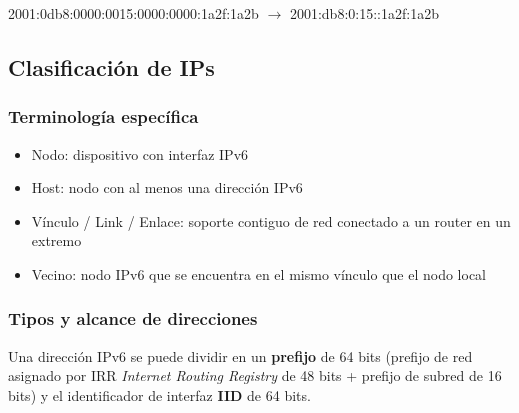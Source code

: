 \documentclass{book}
\begin{document}
	\begin{center}
		2001:0db8:0000:0015:0000:0000:1a2f:1a2b $\rightarrow$ 2001:db8:0:15::1a2f:1a2b
	\end{center}
	
	\subsection{Clasificación de IPs}
	
	\subsubsection{Terminología específica}
	\begin{itemize}
		\item Nodo: dispositivo con interfaz IPv6
		\item Host: nodo con al menos una dirección IPv6
		\item Vínculo / Link / Enlace: soporte contiguo de red conectado a un router en un extremo
		\item Vecino: nodo IPv6 que se encuentra en el mismo vínculo que el nodo local
	\end{itemize}
	
	\subsubsection{Tipos y alcance de direcciones}
	Una dirección IPv6 se puede dividir en un \textbf{prefijo} de 64 bits (prefijo de red asignado por IRR \textit{Internet Routing Registry} de 48 bits + prefijo de subred de 16 bits) y el identificador de interfaz \textbf{IID} de 64 bits.
	
\end{document}
